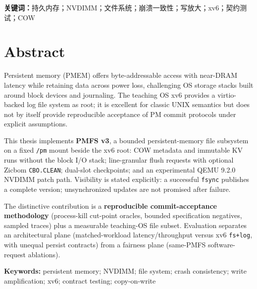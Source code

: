 \documentclass[UTF8,a4paper,zihao=-4,oneside,openany]{ctexbook}
\begin{document}
\textbf{关键词：}持久内存；NVDIMM；文件系统；崩溃一致性；写放大；xv6；契约测试；COW

\chapter*{Abstract}

Persistent memory (PMEM) offers byte-addressable access with near-DRAM latency while retaining data across power loss, challenging OS storage stacks built around block devices and journaling. The teaching OS xv6 provides a virtio-backed log file system as root; it is excellent for classic UNIX semantics but does not by itself provide reproducible acceptance of PM commit protocols under explicit assumptions.

This thesis implements \textbf{PMFS v3}, a bounded persistent-memory file subsystem on a fixed \texttt{/pm} mount beside the xv6 root: COW metadata and immutable KV runs without the block I/O stack; line-granular flush requests with optional Zicbom \texttt{CBO.CLEAN}; dual-slot checkpoints; and an experimental QEMU 9.2.0 NVDIMM patch path. Visibility is stated explicitly: a successful \texttt{fsync} publishes a complete version; unsynchronized updates are not promised after failure.

The distinctive contribution is a \textbf{reproducible commit-acceptance methodology} (process-kill cut-point oracles, bounded specification negatives, sampled traces) plus a measurable teaching-OS file subset. Evaluation separates an architectural plane (matched-workload latency/throughput versus xv6 \texttt{fs+log}, with unequal persist contracts) from a fairness plane (same-PMFS software-request ablations).

\textbf{Keywords:} persistent memory; NVDIMM; file system; crash consistency; write amplification; xv6; contract testing; copy-on-write

\tableofcontents
\clearpage

\mainmatter
{}











\appendix


\backmatter

\end{document}
